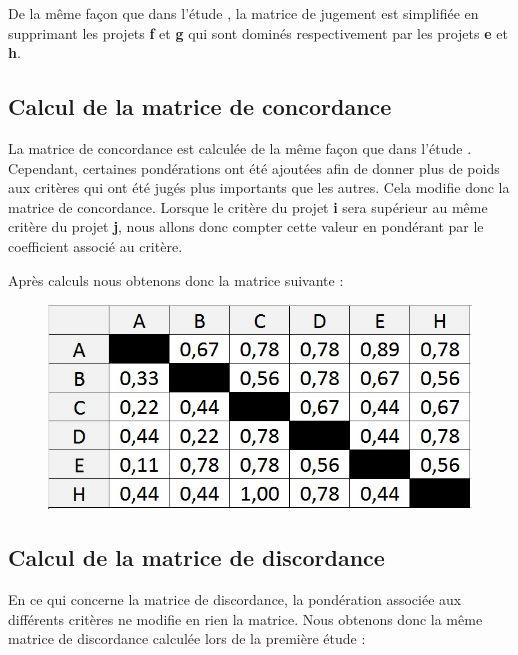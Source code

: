 \documentclass[a4paper,10pt]{article}
\begin{document}
De la même façon que dans l'étude , la matrice de jugement est simplifiée en supprimant les projets \textbf{f} et \textbf{g} qui sont dominés respectivement par les projets \textbf{e} et \textbf{h}.

\subsection{Calcul de la matrice de concordance}

La matrice de concordance est calculée de la même façon que dans l'étude . Cependant, certaines pondérations ont été ajoutées afin de donner plus de poids aux critères qui ont été jugés plus importants que les autres. Cela modifie donc la matrice de concordance. Lorsque le critère du projet \textbf{i} sera supérieur au même critère du projet \textbf{j}, nous allons donc compter cette valeur en pondérant par le coefficient associé au critère. 

Après calculs nous obtenons donc la matrice suivante :


\begin{figure}[h]
\begin{center}
\includegraphics[scale=0.3]{img/AD_Concordance_ponderee.jpg}
\end{center}
\end{figure}

\subsection{Calcul de la matrice de discordance}

En ce qui concerne la matrice de discordance, la pondération associée aux différents critères ne modifie en rien la matrice. Nous obtenons donc la même matrice de discordance calculée lors de la première étude :
\end{document}
